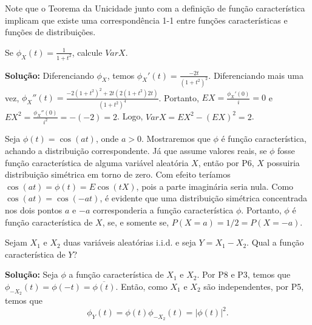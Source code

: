 \begin{frame}
Note que o Teorema da Unicidade junto com a definição de função característica implicam que existe uma correspondência 1-1 entre funções características e funções de distribuições.

\begin{exem}
Se $\phi_X(t)=\frac{1}{1+t^2}$, calcule $Var X$.

{\bf Solução:} Diferenciando $\phi_X$, temos
$\phi_X'(t)=\frac{-2t}{(1+t^2)^2}$. Diferenciando mais uma vez,
$\phi_X''(t)=\frac{-2(1+t^2)^2+2t(2(1+t^2)2t)}{(1+t^2)^4}$.
Portanto, $EX=\frac{\phi_X'(0)}{i}=0$ e
$EX^2=\frac{\phi_X''(0)}{i^2}=-(-2)=2$. Logo, $Var X=EX^2-(EX)^2=2$.
\end{exem}


\begin{exem}
Seja $\phi(t)=\cos(at)$, onde $a>0$. Mostraremos que $\phi$ é função
característica, achando a distribuição correspondente. Já que assume
valores reais, se $\phi$ fosse função característica de alguma
variável aleatória $X$, então por P6, $X$ possuiria distribuição
simétrica em torno de zero. Com efeito teríamos
$\cos(at)=\phi(t)=E\cos(tX)$, pois a parte imaginária seria nula.
Como $\cos(at)=\cos(-at)$, é evidente que uma distribuição simétrica
concentrada nos dois pontos $a$ e $-a$ corresponderia a função
característica $\phi$. Portanto, $\phi$ é função característica de
$X$, se, e somente se, $P(X=a)=1/2=P(X=-a)$.
\end{exem}

\end{frame}


\begin{frame}


\begin{exem}
Sejam $X_1$ e $X_2$ duas variáveis aleatórias i.i.d. e seja
$Y=X_1-X_2$. Qual a função característica de $Y$?

{\bf Solução:} Seja $\phi$ a função característica de $X_1$ e $X_2$.
Por P8 e P3, temos que $\phi_{-X_2}(t)=\phi(-t)=\overline{\phi(t)}$.
Então, como $X_1$ e $X_2$ são independentes, por P5, temos que
$$\phi_Y(t)=\phi(t)\phi_{-X_2}(t)=|\phi(t)|^2.$$
\end{exem}

\end{frame}


